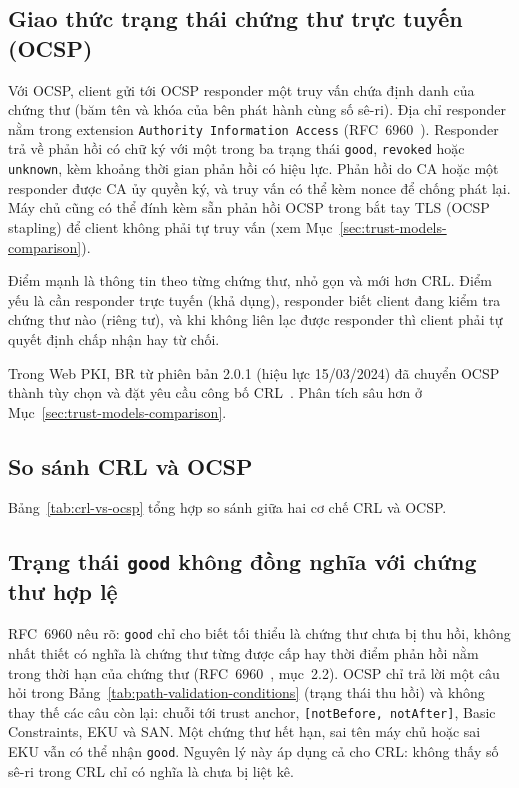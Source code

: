 \subsection{Giao thức trạng thái chứng thư trực tuyến (OCSP)}
\label{subsec:ocsp}

Với OCSP, client gửi tới OCSP responder một truy vấn chứa định danh của chứng thư (băm tên và khóa của bên phát hành cùng số sê-ri). Địa chỉ responder nằm trong extension \texttt{Authority Information Access} (RFC~6960~\cite{rfc6960}). Responder trả về phản hồi có chữ ký với một trong ba trạng thái \texttt{good}, \texttt{revoked} hoặc \texttt{unknown}, kèm khoảng thời gian phản hồi có hiệu lực. Phản hồi do CA hoặc một responder được CA ủy quyền ký, và truy vấn có thể kèm nonce để chống phát lại. Máy chủ cũng có thể đính kèm sẵn phản hồi OCSP trong bắt tay TLS (OCSP stapling) để client không phải tự truy vấn (xem Mục~\ref{sec:trust-models-comparison}).

Điểm mạnh là thông tin theo từng chứng thư, nhỏ gọn và mới hơn CRL. Điểm yếu là cần responder trực tuyến (khả dụng), responder biết client đang kiểm tra chứng thư nào (riêng tư), và khi không liên lạc được responder thì client phải tự quyết định chấp nhận hay từ chối.

Trong Web PKI, BR từ phiên bản 2.0.1 (hiệu lực 15/03/2024) đã chuyển OCSP thành tùy chọn và đặt yêu cầu công bố CRL~\cite{cabforum_br}. Phân tích sâu hơn ở Mục~\ref{sec:trust-models-comparison}.

\subsection{So sánh CRL và OCSP}
\label{subsec:crl-vs-ocsp}

Bảng~\ref{tab:crl-vs-ocsp} tổng hợp so sánh giữa hai cơ chế CRL và OCSP.



\subsection{Trạng thái \texttt{good} không đồng nghĩa với chứng thư hợp lệ}
\label{subsec:good-vs-valid}

RFC~6960 nêu rõ: \texttt{good} chỉ cho biết tối thiểu là chứng thư chưa bị thu hồi, không nhất thiết có nghĩa là chứng thư từng được cấp hay thời điểm phản hồi nằm trong thời hạn của chứng thư (RFC~6960~\cite{rfc6960}, mục~2.2). OCSP chỉ trả lời một câu hỏi trong Bảng~\ref{tab:path-validation-conditions} (trạng thái thu hồi) và không thay thế các câu còn lại: chuỗi tới trust anchor, \texttt{[notBefore, notAfter]}, Basic Constraints, EKU và SAN. Một chứng thư hết hạn, sai tên máy chủ hoặc sai EKU vẫn có thể nhận \texttt{good}. Nguyên lý này áp dụng cả cho CRL: không thấy số sê-ri trong CRL chỉ có nghĩa là chưa bị liệt kê.


